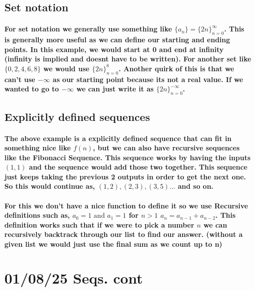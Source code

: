\subsection{Set notation }%
\label{sub:Set notation }

\paragraph{For set notation we generally use something like $\{a_n\} = \{2n\}_{n=0}^{\infty}$. This is generally more useful as we can define our starting and ending points. In this example, we would start at 0 and end at infinity (infinity is implied and doesnt have to be written). For another set like $\{0,2,4,6,8\} $ we would use  $\{2n\}_{n=0}^{8}$. Another quirk of this is that we can't use $-\infty$ as our starting point because its not a real value. If we wanted to go to $-\infty$ we can just write it as $\{2n\}_{n = 0}^{-\infty}$. }

\subsection{Explicitly defined sequences}%
\label{sub:Explicitly defined sequences}

\paragraph{The above example is a explicitly defined sequence that can fit in something nice like $f\left( n \right) $, but we can also have recursive sequences like the Fibonacci Sequence. This sequence works by having the inputs $\left( 1,1 \right) $ and the sequence would add those two together. This sequence just keeps taking the previous 2 outputs in order to get the next one. So this would continue as, $\left( 1,2 \right) , \left( 2,3 \right) , \left( 3,5 \right) \ldots$ and so on. }

\paragraph{For this we don't have a nice function to define it so we use Recursive definitions such as, $a_0 = 1 \text{ and } a_1 = 1 $ for $n>1$ $a_n=a_{n-1}+a_{n-2}$. This definition works such that if we were to pick a number $n$ we can recursively backtrack through our list to find our answer. (without a given list we would just use the final sum as we count up to n)}

\section*{01/08/25 Seqs. cont}%
\label{sec:01/08/25 Seqs. cont}

